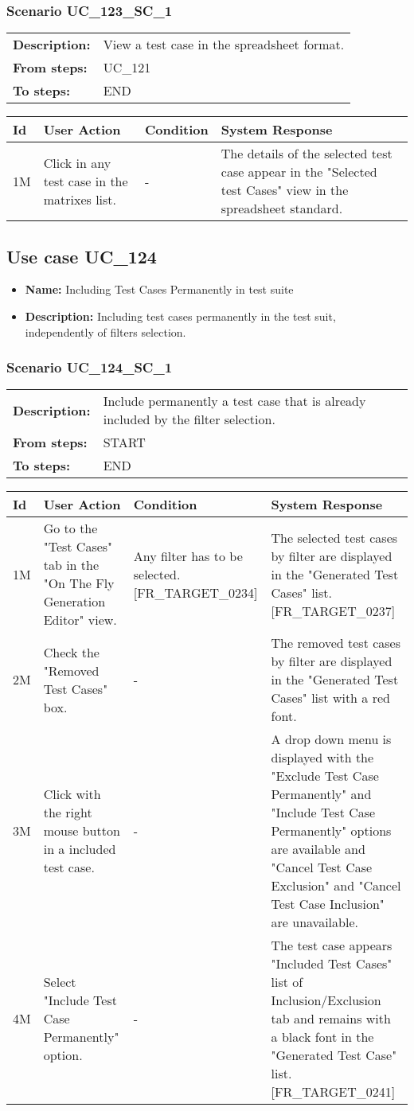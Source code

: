 \documentclass[a4paper,11pt]{article}
\newcommand{\bl}{\\ \hline}
\begin{document}
\subsubsection*{Scenario UC_123_SC_1}
\begin{tabular}{p{1in}p{4in}}
{\bf Description:} & View a test case in the spreadsheet format. \\
{\bf From steps:} & UC_121#2M \\
{\bf To steps:} & END \\
\end{tabular}
 
\begin{tabular}{|p{0.8in}|p{1.6in}|p{1.6in}|p{1.6in}|}
\hline
Id & User Action & Condition & System Response  \bl 
1M & Click in any test case in the matrixes list. & - & The details of the selected test case appear in the "Selected test Cases" view in the spreadsheet standard. \bl 
\end{tabular}
\subsection*{Use case UC_124}
\begin{itemize}
\item {\bf Name: }Including Test Cases Permanently in test suite
\item {\bf Description: }Including test cases permanently in the test suit, independently of filters selection.
\end{itemize}
\subsubsection*{Scenario UC_124_SC_1}
\begin{tabular}{p{1in}p{4in}}
{\bf Description:} & Include permanently a test case that is already included by the filter selection. \\
{\bf From steps:} & START \\
{\bf To steps:} & END \\
\end{tabular}
 
\begin{tabular}{|p{0.8in}|p{1.6in}|p{1.6in}|p{1.6in}|}
\hline
Id & User Action & Condition & System Response  \bl 
1M & Go to the "Test Cases" tab in the "On The Fly Generation Editor" view. & Any filter has to be selected. [FR_TARGET_0234] & The selected test cases by filter are displayed in the "Generated Test Cases" list. [FR_TARGET_0237] \bl 
2M & Check the "Removed Test Cases" box. & - & The removed test cases by filter are displayed in the "Generated Test Cases" list with a red font. \bl 
3M & Click with the right mouse button in a included test case. & - & A drop down menu is displayed with the "Exclude Test Case Permanently" and "Include Test Case Permanently" options are available and "Cancel Test Case Exclusion" and "Cancel Test Case Inclusion" are unavailable. \bl 
4M & Select "Include Test Case Permanently" option. & - & The test case appears "Included Test Cases" list of Inclusion/Exclusion tab and remains with a black font in the "Generated Test Case" list. [FR_TARGET_0241] \bl 
\end{tabular}
\end{document}
